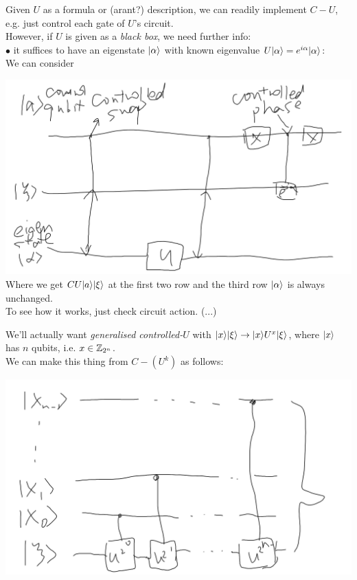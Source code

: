\documentclass[a4paper]{article}
\begin{document}
\begin{rem}
    Given $U$ as a formula or (arant?) description, we can readily implement $C-U$, e.g. just control each gate of $U$'s circuit.\\
    However, if $U$ is given as a \emph{black box}, we need further info:\\
    $\bullet$ it suffices to have an eigenstate $|\alpha\rangle$ with known eigenvalue $U|\alpha\rangle = e^{i\alpha} |\alpha\rangle$:\\
    We can consider

    \includegraphics[scale=0.5]{image/QC_01.png}
    Where we get $CU|a\rangle |\xi\rangle$ at the first two row and the third row $|\alpha\rangle$ is always unchanged.\\
    To see how it works, just check circuit action. (...)
\end{rem}

We'll actually want \emph{generalised controlled-$U$} with $|x\rangle |\xi\rangle \to |x\rangle U^x |\xi\rangle$, where $|x\rangle$ has $n$ qubits, i.e. $x \in \mathbb{Z}_{2^n}$.\\
We can make this thing from $C-(U^k)$ as follows:

\includegraphics[scale=0.5]{image/QC_02.png}
\end{document}
